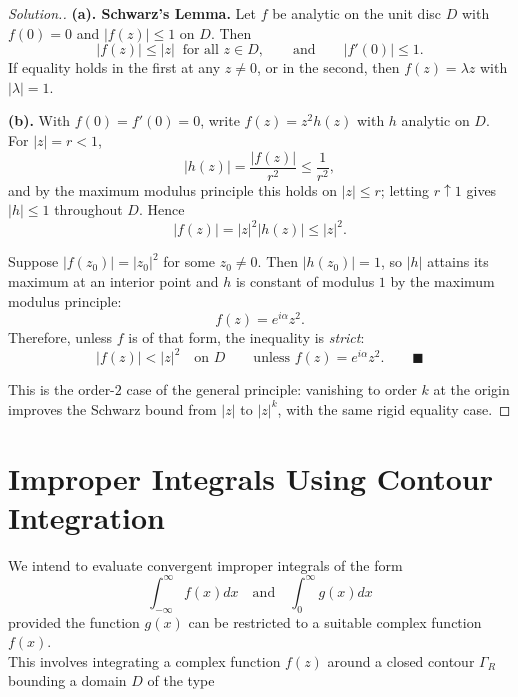 \documentclass[11pt,a4paper]{article}
\theoremstyle{definition}
\newenvironment{solution}
  {\renewcommand{\qedsymbol}{}\begin{proof}[\textit{Solution}.]}
  {\end{proof}}
\begin{document}
\begin{solution}
\textbf{(a). Schwarz's Lemma.} Let $f$ be analytic on the unit disc $D$ with
$f(0) = 0$ and $\left|f(z)\right| \leq 1$ on $D$. Then
$$\left|f(z)\right| \leq \left|z\right| \ \text{ for all } z \in D,
\qquad\text{and}\qquad \left|f'(0)\right| \leq 1 .$$
If equality holds in the first at any $z \neq 0$, or in the second, then
$f(z) = \lambda z$ with $\left|\lambda\right| = 1$.

\textbf{(b).} With $f(0) = f'(0) = 0$, write $f(z) = z^{2}h(z)$ with $h$ analytic
on $D$. For $\left|z\right| = r < 1$,
$$\left|h(z)\right| = \frac{\left|f(z)\right|}{r^{2}} \leq \frac{1}{r^{2}},$$
and by the maximum modulus principle this holds on $\left|z\right| \leq r$; letting
$r \uparrow 1$ gives $\left|h\right| \leq 1$ throughout $D$. Hence
$$\left|f(z)\right| = \left|z\right|^{2}\left|h(z)\right| \leq \left|z\right|^{2} .$$

Suppose $\left|f(z_0)\right| = \left|z_0\right|^{2}$ for some $z_0 \neq 0$. Then
$\left|h(z_0)\right| = 1$, so $\left|h\right|$ attains its maximum at an interior
point and $h$ is constant of modulus $1$ by the maximum modulus principle:
$$f(z) = e^{i\alpha}z^{2}.$$
Therefore, unless $f$ is of that form, the inequality is \emph{strict}:
$$\boxed{\left|f(z)\right| < \left|z\right|^{2} \quad\text{on } D
\qquad\text{unless } f(z) = e^{i\alpha}z^{2}. } \qquad \blacksquare$$

This is the order-$2$ case of the general principle: vanishing to order $k$ at the
origin improves the Schwarz bound from $\left|z\right|$ to $\left|z\right|^{k}$,
with the same rigid equality case.
\end{solution}


\pagebreak
{\color[wave]{485}\section{Improper Integrals Using Contour Integration}}
We intend to evaluate convergent improper integrals of the form $$\int^{\infty}_{-\infty} f(x)dx\quad  \text{and}\quad  \int^{\infty}_0 g(x)dx$$
provided  the function $g(x)$ can be restricted to a suitable complex function $f(x)$.\\

This involves integrating a complex function $f(z)$ around a closed contour $\Gamma_R$ bounding a domain $D$ of the type


\end{document}
